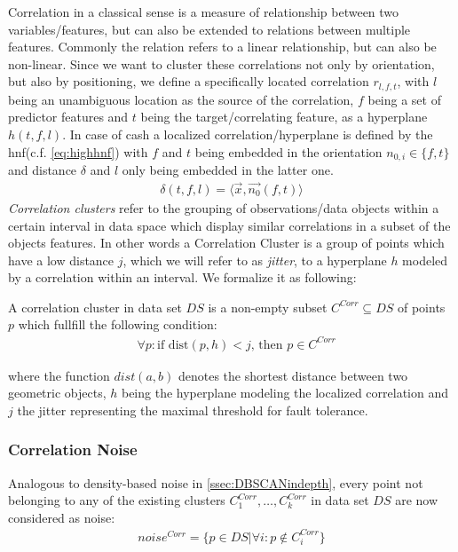Correlation in a classical sense is a measure of relationship between two variables/features, but can also be extended to relations between multiple features. Commonly the relation refers to a linear relationship, but can also be non-linear. Since we want to cluster these correlations not only by orientation, but also by positioning, we define a specifically located correlation $r_{l,f,t}$, with $l$ being an unambiguous location as the source of the correlation, $f$ being a set of predictor features and $t$ being the target/correlating feature, as a hyperplane $h(t,f,l)$. In case of \gls{cash} a localized correlation/hyperplane is defined by the \gls{hnf}(c.f. \autoref{eq:highhnf}) with $f$ and $t$ being embedded in the orientation $n_{0,i} \in \{f,t\}$ and distance $\delta$ and $l$ only being embedded in the latter one. 
\begin{align}
    \delta(t,f,l) = \langle \vec{x},\vec{n_0}(f,t) \rangle
\end{align}
\textit{Correlation clusters} refer to the grouping of observations/data objects within a certain interval in data space which display similar correlations in a subset of the objects features. In other words a Correlation Cluster is a group of points which have a low distance $j$, which we will refer to as \textit{jitter}, to a hyperplane $h$ modeled by a correlation within an interval. We formalize it as following:

A correlation cluster in data set $DS$ is a non-empty subset $C^{Corr} \subseteq DS$ of points $p$ which fullfill the following condition:
\begin{align}
    &\forall p: \text{if } \text{dist}(p,h) < j \text{, then } p \in C^{Corr}
\end{align}

where the function $dist(a,b)$ denotes the shortest distance between two geometric objects, $h$ being the hyperplane modeling the localized correlation and $j$ the jitter representing the maximal threshold for fault tolerance.


\subsubsection*{Correlation Noise}
Analogous to density-based noise in \autoref{ssec:DBSCANindepth}, every point not belonging to any of the existing clusters $C^{Corr}_1, \dotsc, C^{Corr}_k$ in data set $DS$ are now considered as noise: 
\begin{align}
    noise^{Corr} = \{p \in  DS | \forall i : p \notin C^{Corr}_i\}
\end{align}

